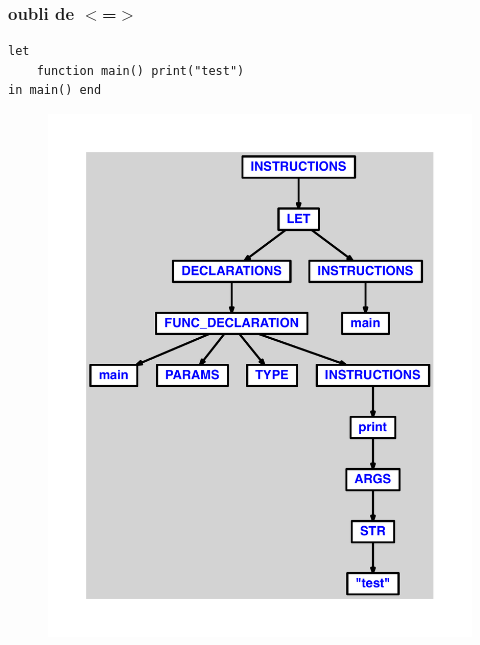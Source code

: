 \documentclass{article}
\begin{document}
\subsubsection{oubli de $ < $=$ > $}
\begin{lstlisting}
let
	function main() print("test")
in main() end
\end{lstlisting}
\newpage
\begin{figure}[H]
\centering
\includegraphics[max width=\textwidth]{ast/ast_223.pdf}
\end{figure}
\newpage
\end{document}
